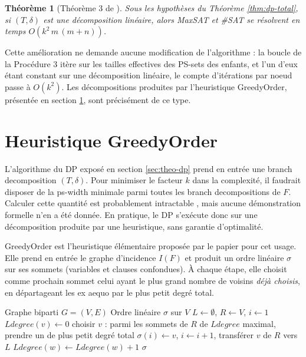 \documentclass[11pt,a4paper]{report}
\theoremstyle{plain}
\newtheorem{theorem}{Théorème}[chapter]
\theoremstyle{definition}
\begin{document}
\begin{theorem}[Théorème 3 de \cite{saether2015}]
\label{thm:dp-linear}
Sous les hypothèses du Théorème \ref{thm:dp-total}, si $(T, \delta)$ est
une décomposition linéaire, alors MaxSAT et \#SAT se résolvent en temps
$O(k^2\, m\, (m + n))$.
\end{theorem}

Cette amélioration ne demande aucune modification de l'algorithme : la
boucle de la Procédure 3 itère sur les tailles effectives des PS-sets
des enfants, et l'un d'eux étant constant sur une décomposition
linéaire, le compte d'itérations par noeud passe à $O(k^2)$. Les
décompositions produites par l'heuristique GreedyOrder, présentée en
section \ref{sec:theo-greedy}, sont précisément de ce type.

\section{Heuristique GreedyOrder}
\label{sec:theo-greedy}

L'algorithme du DP exposé en section \ref{sec:theo-dp} prend en entrée
une branch decomposition $(T, \delta)$. Pour minimiser le facteur $k$
dans la complexité, il faudrait disposer de la ps-width minimale parmi
toutes les branch decompositions de $F$. Calculer cette quantité est
probablement intractable \cite{saether2015}, mais aucune démonstration
formelle n'en a été donnée. En pratique, le DP s'exécute donc sur une
décomposition produite par une heuristique, sans garantie d'optimalité.

GreedyOrder est l'heuristique élémentaire proposée par le papier pour
cet usage. Elle prend en entrée le graphe d'incidence $I(F)$ et produit
un ordre linéaire $\sigma$ sur ses sommets (variables et clauses
confondues). À chaque étape, elle choisit comme prochain sommet celui
ayant le plus grand nombre de voisins \emph{déjà choisis}, en
départageant les ex aequo par le plus petit degré total.

\begin{algorithm}[H]
\caption{GreedyOrder}
\label{algo:greedyorder}
\begin{algorithmic}[1]
\Require Graphe biparti $G = (V, E)$
\Ensure Ordre linéaire $\sigma$ sur $V$
\State $L \leftarrow \emptyset$, $R \leftarrow V$, $i \leftarrow 1$
 \State $\mathit{Ldegree}(v) \leftarrow 0$ \EndFor
{}
  \State choisir $v$ : parmi les sommets de $R$ de $\mathit{Ldegree}$ maximal, prendre un de plus petit degré total
  \State $\sigma(i) \leftarrow v$, $i \leftarrow i + 1$, transférer $v$ de $R$ vers $L$
    \State $\mathit{Ldegree}(w) \leftarrow \mathit{Ldegree}(w) + 1$
  \EndFor
\EndWhile
\State \Return $\sigma$
\end{algorithmic}
\end{algorithm}
\end{document}
